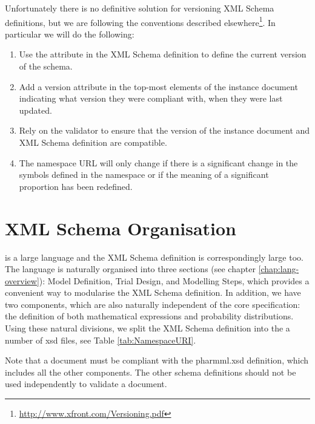 Unfortunately there is no definitive solution for versioning XML
Schema definitions, but we are following the conventions described
elsewhere\footnote{\url{http://www.xfront.com/Versioning.pdf}}. In particular we
will do the following:
\begin{enumerate}
\item Use the  attribute in the XML Schema definition to
  define the current version of the schema.
\item Add a version attribute in the top-most elements of the instance
  document indicating what version they were compliant with, when they
  were last updated.
\item Rely on the \pharmml validator to ensure that the version of the
  instance document and XML Schema definition are compatible.
\item The namespace URL will only change if there is a significant
  change in the symbols defined in the namespace or if the meaning of
  a significant proportion has been redefined.
\end{enumerate}

\section{XML Schema Organisation}

\pharmml is a large language and the XML Schema definition is
correspondingly large too. The language is naturally organised into three 
sections (see chapter \ref{chap:lang-overview}): Model Definition, Trial Design, 
and Modelling Steps, which provides a convenient way to modularise
the XML Schema definition. In addition, we have two components, which
are also naturally independent of the core \pharmml specification: the
definition of both mathematical expressions and probability
distributions. Using these natural divisions, we split the \pharmml XML Schema
definition into the a number of xsd files, see Table \ref{tab:NamespaceURI}.

Note that a \pharmml document must be compliant with the pharmml.xsd
definition, which includes all the other components. The other schema
definitions should not be used independently to validate a \pharmml
document.


